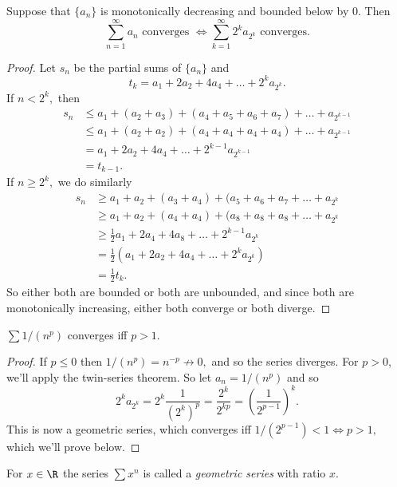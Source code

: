 \documentclass{notes}
\begin{document}
\begin{theorem}
  Suppose that $\{a_n\}$ is monotonically decreasing and bounded below by 0. Then $$\sum_{n=1}^\infty a_n
  \text{ converges } \iff \sum_{k=1}^\infty 2^k a_{2^k} \text{ converges.}$$
\end{theorem}
\begin{proof}
  Let $s_n$ be the partial sums of $\{a_n\}$ and $$t_k = a_1 + 2a_2 + 4a_4 + \dots + 2^ka_{2^k}.$$
  If $n < 2^k,$ then 
  \begin{align*}
    s_n &\leq a_1 + (a_2 + a_3) + (a_4 + a_5 + a_6 + a_7) + \dots + a_{2^{k - 1}} \\
        &\leq a_1 + (a_2 + a_2) + (a_4 + a_4 + a_4 + a_4) + \dots + a_{2^{k - 1}} \\
        &= a_1 + 2a_2 + 4a_4 + \dots + 2^{k-1}a_{2^{k-1}} \\
        &= t_{k-1}.
  \end{align*}
  If $n \geq 2^k,$ we do similarly
  \begin{align*}
    s_n &\geq a_1 + a_2 + (a_3 + a_4) + (a_5 + a_6 + a_7 + \dots + a_{2^k} \\
        &\geq a_1 + a_2 + (a_4 + a_4) + (a_8 + a_8 + a_8 + \dots + a_{2^k} \\
        &\geq \frac{1}{2}a_1 + 2a_4 + 4a_8 + \dots + 2^{k-1}a_{2^k} \\
        &= \frac{1}{2}\left( a_1 + 2a_2 + 4a_4 + \dots + 2^ka_{2^k} \right) \\
        &= \frac{1}{2}t_k.
  \end{align*}
  So either both are bounded or both are unbounded, and since both are monotonically increasing, either
  both converge or both diverge.
\end{proof}

\begin{corollary}[$p$-Series]
  $\sum 1/(n^p)$ converges iff $p > 1$.
\end{corollary}
\begin{proof}
  If $p \leq 0$ then $1/(n^p) = n^{-p} \not\to 0,$ and so the series diverges. For $p > 0$, we'll 
  apply the twin-series theorem. So let $a_n = 1/(n^p)$ and so $$2^ka_{2^k} = 2^k \frac{1}{(2^k)^p} = 
  \frac{2^k}{2^{kp}} = \left( \frac{1}{2^{p-1}} \right)^k.$$ This is now a geometric series, which converges
  iff $1/(2^{p-1}) < 1 \iff p > 1,$ which we'll prove below.
\end{proof}

\begin{defn}
  For $x\in\R$ the series $\sum x^n$ is called a \emph{geometric series} with ratio $x$.
\end{defn}
\end{document}
